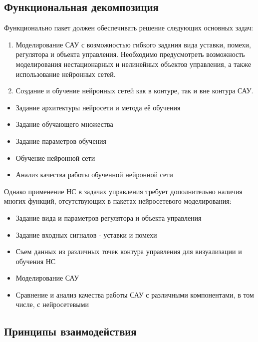 \subsection{Функциональная декомпозиция}

Функционально пакет должен обеспечивать решение следующих основных
задач:
\begin{enumerate}
\item Моделирование САУ с возможностью гибкого задания вида уставки,
  помехи, регулятора и объекта управления.  Необходимо предусмотреть
  возможность моделирования нестационарных и нелинейных объектов
  управления, а также использование нейронных сетей.
\item Создание и обучение нейронных сетей как в контуре, так и вне
  контура САУ.
\end{enumerate}

\begin{itemize}
\item Задание архитектуры нейросети и метода её обучения
\item Задание обучающего множества
\item Задание параметров обучения
\item Обучение нейронной сети
\item Анализ качества работы обученной нейронной сети
\end{itemize}

Однако применение НС в задачах управления требует дополнительно
наличия многих функций, отсутствующих в пакетах нейросетевого
моделирования:

\begin{itemize}
\item Задание вида и параметров регулятора и объекта управления
\item Задание входных сигналов - уставки и помехи
\item Съем данных из различных точек контура управления для
  визуализации и обучения НС
\item Моделирование САУ
\item Сравнение и анализ качества работы САУ с различными
  компонентами, в том числе, с нейросетевыми
\end{itemize}


\subsection{Принципы взаимодействия}




